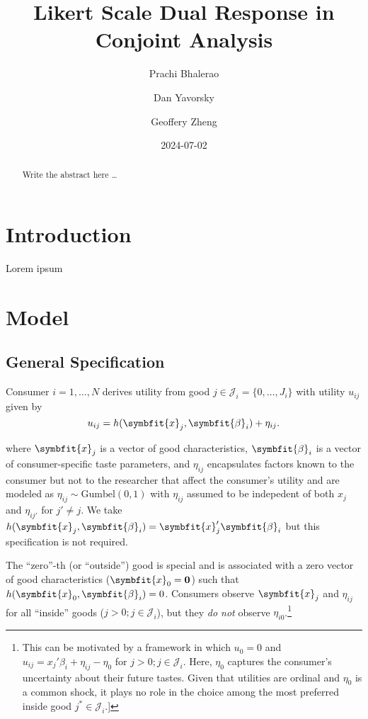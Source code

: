 \documentclass[
]{article}
\title{Likert Scale Dual Response in Conjoint Analysis}
\author{Prachi Bhalerao \and Dan Yavorsky \and Geoffery Zheng}
\date{2024-07-02}
\begin{document}
\maketitle
\begin{abstract}
Write the abstract here \ldots{}
\end{abstract}


\section{Introduction}\label{sec-intro}

Lorem ipsum

\section{Model}\label{sec-model}

\subsection{General Specification}\label{general-specification}

Consumer \(i=1,\ldots,N\) derives utility from good
\(j \in \mathcal{J}_i =  \lbrace 0,\ldots,J_i \rbrace\) with utility
\(u_{ij}\) given by \[
u_{ij} = h(\symbfit{x}_j, \symbfit{\beta}_i) + \eta_{ij}.
\]

where \(\symbfit{x}_j\) is a vector of good characteristics,
\(\symbfit{\beta}_i\) is a vector of consumer-specific taste parameters,
and \(\eta_{ij}\) encapsulates factors known to the consumer but not to
the researcher that affect the consumer's utility and are modeled as
\(\eta_{ij} \sim \text{Gumbel} \left( 0,1 \right)\) with \(\eta_{ij}\)
assumed to be indepedent of both \(x_j\) and \(\eta_{ij'}\) for
\(j' \ne j\). We take
\(h(\symbfit{x}_j, \symbfit{\beta}_i) = \symbfit{x}_j'\symbfit{\beta}_i\)
but this specification is not required.

The ``zero''-th (or ``outside'') good is special and is associated with
a zero vector of good characteristics (\(\symbfit{x}_0 = \mathbf{0}\))
such that \(h(\symbfit{x}_0, \symbfit{\beta}_i)=0\). Consumers observe
\(\symbfit{x}_j\) and \(\eta_{ij}\) for all ``inside'' goods
(\(j>0; j \in \mathcal{J}_i\)), but they \emph{do not} observe
\(\eta_{i0}\).\footnote{This can be motivated by a framework in which
  \(u_0 = 0\) and \(u_{ij} = {x_j}'\beta_i + \eta_{ij} - \eta_0\) for
  \(j>0; j \in \mathcal{J}_i\). Here, \(\eta_0\) captures the consumer's
  uncertainty about their future tastes. Given that utilities are
  ordinal and \(\eta_0\) is a common shock, it plays no role in the
  choice among the most preferred inside good
  \(j^* \in \mathcal{J}_i\).{]}}
\end{document}
